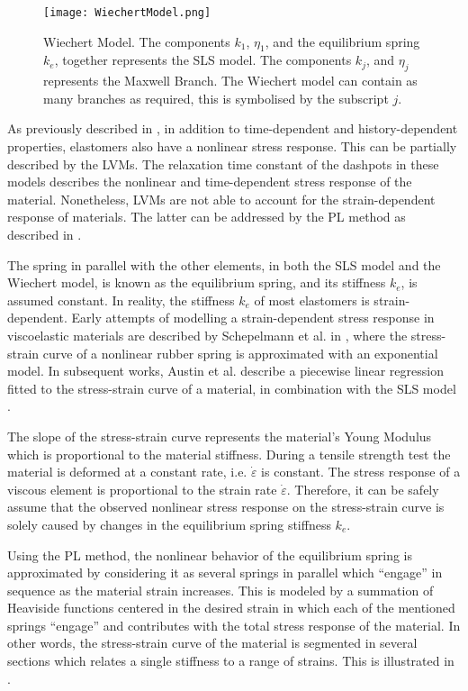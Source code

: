 \begin{figure}[hbt!]
	\centering
    \texttt{[image: WiechertModel.png]}
    \caption{Wiechert Model. The components $k_1$, $\eta_1$, and the equilibrium spring $k_e$, together represents the SLS model. The components $k_j$, and $\eta_j$ represents the Maxwell Branch. The Wiechert model can contain as many branches as required, this is symbolised by the subscript $j$. }
    \label{fig:wiechert}
\end{figure}

As previously described in , in addition to time-dependent and history-dependent properties, elastomers also have a nonlinear stress response. This can be partially described by the LVMs. The relaxation time constant of the dashpots in these models describes the nonlinear and time-dependent stress response of the material. Nonetheless, LVMs are not able to account for the strain-dependent response of materials. The latter can be addressed by the PL method as described in \cite{austin2015control}.

The spring in parallel with the other elements, in both the SLS model and the Wiechert model, is known as the equilibrium spring, and its stiffness $k_e$, is assumed constant. In reality, the stiffness $k_e$ of most elastomers is strain-dependent. Early attempts of modelling a strain-dependent stress response in viscoelastic materials are described by Schepelmann et al. in \cite{schepelmann2014compact}, where the stress-strain curve of a nonlinear rubber spring is approximated with an exponential model. In subsequent works, Austin et al. describe a piecewise linear regression fitted to the stress-strain curve of a material, in combination with the SLS model \cite{austin2015control}. 

The slope of the stress-strain curve represents the material's Young Modulus which is proportional to the material stiffness. During a tensile strength test the material is deformed at a constant rate, i.e. $\dot{\varepsilon}$ is constant. The stress response of a viscous element is proportional to the strain rate $\dot{\varepsilon}$. Therefore, it can be safely assume that the observed nonlinear stress response  on the stress-strain curve is solely caused by changes in the equilibrium spring stiffness $k_e$.

Using the PL method, the nonlinear behavior of the equilibrium spring is approximated by considering it as several springs in parallel which ``engage'' in sequence as the material strain increases. This is modeled by a summation of Heaviside functions centered in the desired strain in which each of the mentioned springs ``engage'' and contributes with the total stress response of the material. In other words, the stress-strain curve of the material is segmented in several sections which relates a single stiffness to a range of strains. This is illustrated in .

